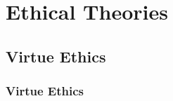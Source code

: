 \documentclass[aspectratio=169, 10pt]{beamer}
\begin{document}
\section{Ethical Theories}
\subsection{Virtue Ethics}
\begin{frame}
\frametitle{Virtue Ethics}
\end{frame}
\end{document}

